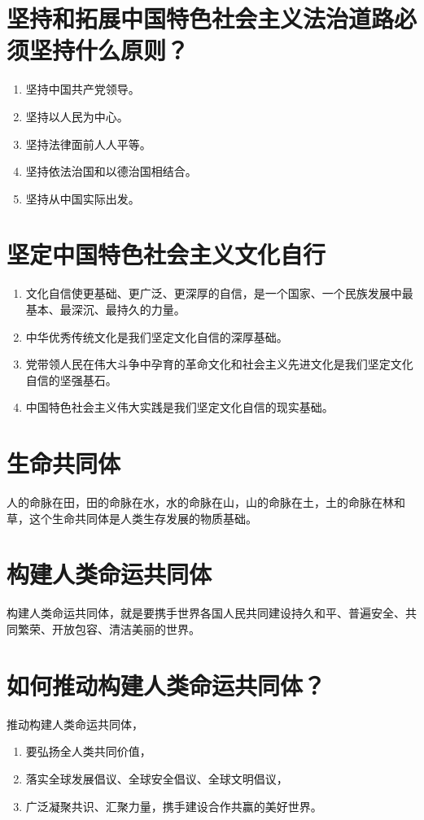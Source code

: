 \documentclass[12pt, a4paper, oneside]{ctexbook}
\begin{document}
\section{坚持和拓展中国特色社会主义法治道路必须坚持什么原则？}

\begin{enumerate}
\item 坚持中国共产党领导。

\item 坚持以人民为中心。

\item 坚持法律面前人人平等。

\item 坚持依法治国和以德治国相结合。

\item 坚持从中国实际出发。
\end{enumerate}

\section{坚定中国特色社会主义文化自行}

\begin{enumerate}
\item 文化自信使更基础、更广泛、更深厚的自信，是一个国家、一个民族发展中最基本、最深沉、最持久的力量。

\item 中华优秀传统文化是我们坚定文化自信的深厚基础。

\item 党带领人民在伟大斗争中孕育的革命文化和社会主义先进文化是我们坚定文化自信的坚强基石。

\item 中国特色社会主义伟大实践是我们坚定文化自信的现实基础。
\end{enumerate}

\section{生命共同体}

人的命脉在田，田的命脉在水，水的命脉在山，山的命脉在土，土的命脉在林和草，这个生命共同体是人类生存发展的物质基础。

\section{构建人类命运共同体}

构建人类命运共同体，就是要携手世界各国人民共同建设持久和平、普遍安全、共同繁荣、开放包容、清洁美丽的世界。

\section{如何推动构建人类命运共同体？}

推动构建人类命运共同体，
\begin{enumerate}
\item 要弘扬全人类共同价值，

\item 落实全球发展倡议、全球安全倡议、全球文明倡议，

\item 广泛凝聚共识、汇聚力量，携手建设合作共赢的美好世界。
\end{enumerate}
\end{document}
